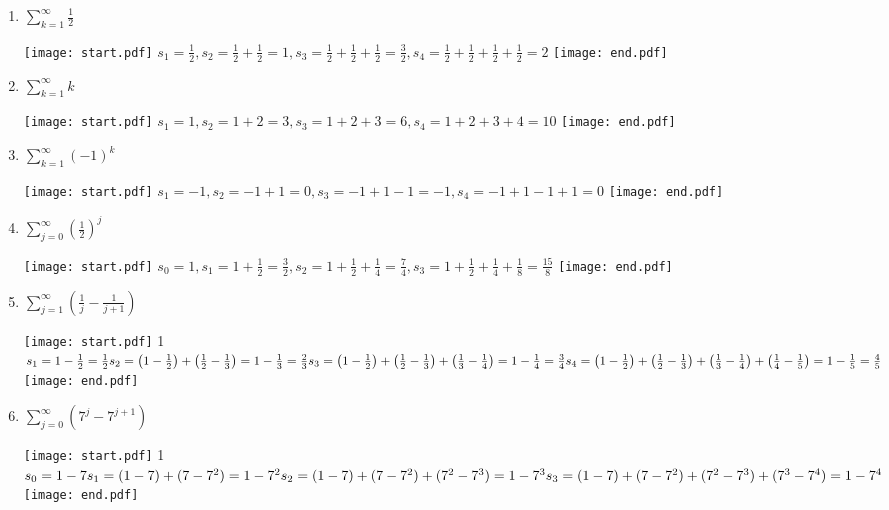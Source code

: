 \documentclass[12pt]{article}
\begin{document}
\begin{enumerate}

\item $\sum_{k=1}^{\infty}\frac{1}{2}$

\texttt{[image: start.pdf]}
{{$s_1=\frac{1}{2}, s_2=\frac{1}{2}+\frac{1}{2}=1, 
s_3=\frac{1}{2}+\frac{1}{2}+\frac{1}{2}=\frac{3}{2}, s_4=\frac{1}{2}+\frac{1}{2}+\frac{1}{2}+\frac{1}{2}=2$    }}
\texttt{[image: end.pdf]}


\item $\sum_{k=1}^{\infty}k$

\texttt{[image: start.pdf]}
{{$s_1=1, s_2=1+2=3, s_3=1+2+3=6, s_4=1+2+3+4=10$    }}
\texttt{[image: end.pdf]}


\item $\sum_{k=1}^{\infty}(-1)^{k}$

\texttt{[image: start.pdf]}
{{$s_1=-1, s_2=-1+1=0, s_3=-1+1-1=-1, s_4=-1+1-1+1=0$    }}
\texttt{[image: end.pdf]}


\item $\sum_{j=0}^{\infty} \left(\frac{1}{2}\right)^{j}$

\texttt{[image: start.pdf]}
{{$s_0=1, s_1=1+\frac{1}{2}=\frac{3}{2}, s_2=1+\frac{1}{2}+\frac{1}{4}=\frac{7}{4}, s_3=1+\frac{1}{2}+\frac{1}{4}+\frac{1}{8}=\frac{15}{8}$    }}
\texttt{[image: end.pdf]}


\item $\sum_{j=1}^{\infty} \left(\frac{1}{j}-\frac{1}{j+1}\right)$

\texttt{[image: start.pdf]}
{{{1\linewidth}{$s_1=1-\frac{1}{2}=\frac{1}{2}
\\s_2=\left(1-\frac{1}{2}\right)+\left(\frac{1}{2}-\frac{1}{3}\right)=1-\frac{1}{3}=\frac{2}{3}
\\s_3=\left(1-\frac{1}{2}\right)+\left(\frac{1}{2}-\frac{1}{3}\right)+\left(\frac{1}{3}-\frac{1}{4}\right)=1-\frac{1}{4}=\frac{3}{4}
\\s_4=\left(1-\frac{1}{2}\right)+\left(\frac{1}{2}-\frac{1}{3}\right)+\left(\frac{1}{3}-\frac{1}{4}\right)+\left(\frac{1}{4}-\frac{1}{5}\right)=1-\frac{1}{5}=\frac{4}{5}$    }}}
\texttt{[image: end.pdf]}


\item $\sum_{j=0}^{\infty}(7^{j}-7^{j+1})$

\texttt{[image: start.pdf]}
{{{1\linewidth}{$s_0=1-7
\\s_1=(1-7)+(7-7^2)=1-7^2
\\s_2=(1-7)+(7-7^2)+(7^2-7^3)=1-7^3
\\s_3=(1-7)+(7-7^2)+(7^2-7^3)+(7^3-7^4)=1-7^4$    }}}
\texttt{[image: end.pdf]}



\end{enumerate}
\end{document}
